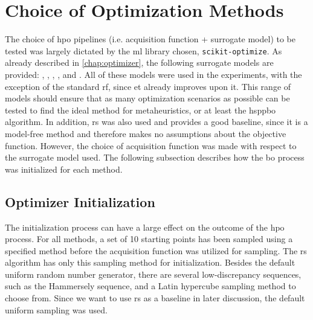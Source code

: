 \section{Choice of Optimization Methods}

The choice of \gls{hpo} pipelines (i.e. acquisition function + surrogate model) to be tested was largely dictated by the \gls{ml} library chosen, \texttt{scikit-optimize}. As already described in \cref{chap:optimizer}, the following surrogate models are provided: , , , , and .
All of these models were used in the experiments, with the exception of the standard \gls{rf}, since \gls{et} already improves upon it. This range of models should ensure that as many optimization scenarios as possible can be tested to find the ideal method for metaheuristics, or at least the \gls{hsppbo} algorithm. In addition, \gls{rs} was also used and provides a good baseline, since it is a model-free method and therefore makes no assumptions about the objective function. However, the choice of acquisition function was made with respect to the surrogate model used. The following subsection describes how the \gls{bo} process was initialized for each method.

\subsection{Optimizer Initialization}
\label{chap:opt-init}
The initialization process can have a large effect on the outcome of the \gls{hpo} process. For all methods, a set of 10 starting points has been sampled using a specified method before the acquisition function was utilized for sampling. The \gls{rs} algorithm has only this sampling method for initialization. Besides the default uniform random number generator, there are several low-discrepancy sequences, such as the Hammersely sequence, and a Latin hypercube sampling method to choose from. Since we want to use \gls{rs} as a baseline in later discussion, the default uniform sampling was used.

